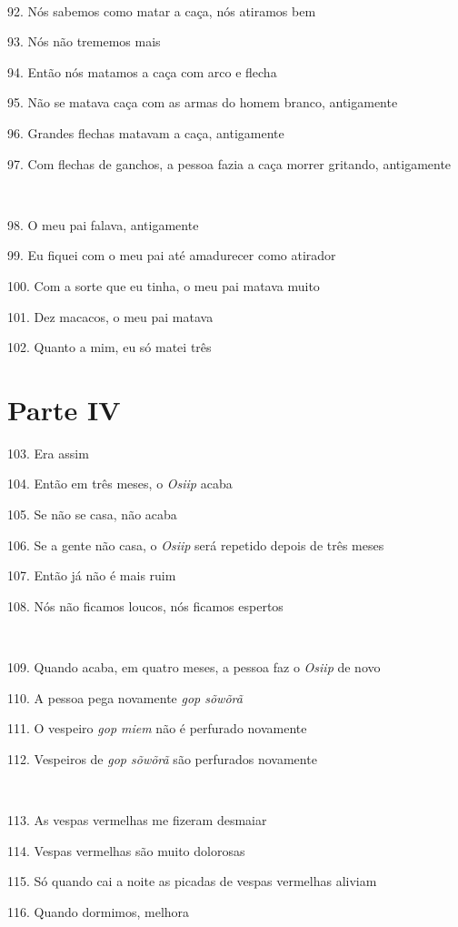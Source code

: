 ~

92. Nós sabemos como matar a caça, nós atiramos bem

93. Nós não trememos mais

94. Então nós matamos a caça com arco e flecha

95. Não se matava caça com as armas do homem branco, antigamente

96. Grandes flechas matavam a caça, antigamente

97. Com flechas de ganchos, a pessoa fazia a caça morrer gritando, antigamente

~

98. O meu pai falava, antigamente

99. Eu fiquei com o meu pai até amadurecer como atirador

100. Com a sorte que eu tinha, o meu pai matava muito

101. Dez macacos, o meu pai matava

102. Quanto a mim, eu só matei três

\section{Parte IV}

103. Era assim

104. Então em três meses, o \emph{Osiip} acaba

105. Se não se casa, não acaba

106. Se a gente não casa, o \emph{Osiip} será repetido depois de três meses

107. Então já não é mais ruim

108. Nós não ficamos loucos, nós ficamos espertos

~

109. Quando acaba, em quatro meses, a pessoa faz o \emph{Osiip} de novo

110. A pessoa pega novamente \emph{gop sõwõrã}

111. O vespeiro \emph{gop miem} não é perfurado novamente

112. Vespeiros de \emph{gop sõwõrã} são perfurados novamente

~

113. As vespas vermelhas me fizeram desmaiar

114. Vespas vermelhas são muito dolorosas

115. Só quando cai a noite as picadas de vespas vermelhas aliviam

116. Quando dormimos, melhora

